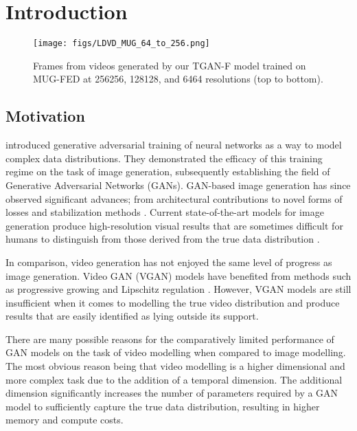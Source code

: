 \documentclass[a4paper,fleqn]{cas-sc}
\begin{document}
\maketitle


\section{Introduction}

\begin{figure}[pos=!h]
    \centering
    \texttt{[image: figs/LDVD\_MUG\_64\_to\_256.png]}
    
    \caption{Frames from videos generated by our TGAN-F model trained on MUG-FED at 256256,
128128, and 6464 resolutions (top to bottom).} 
    \label{fig:MUG_ldvd_64_256}
\end{figure}

\subsection{Motivation}
\citet{GoodfellowPMXWOCB14generative} introduced generative adversarial training of neural networks as a way to model complex data distributions. They demonstrated the efficacy of this training regime on the task of image generation, subsequently establishing the field of Generative Adversarial Networks (GANs). GAN-based image generation has since observed significant advances; from architectural contributions \cite{RadfordMC15unsupervised,zhangGMO2018attention, karras2018progressive} to novel forms of losses \cite{ArjovskyCB17wasserstein,jolicoeur-martineau2018relativistic} and stabilization methods \cite{MiyatoKKY18spectral,HeuselRUNH17updaterule, salimansGZCRCC2016improved,Gulrajani2017improved}. Current state-of-the-art models for image generation produce high-resolution visual results that are sometimes difficult for humans to distinguish from those derived from the true data distribution \cite{brockDS2018large,karrasLA2018style}.

In comparison, video generation has not enjoyed the same level of progress as image generation. Video GAN (VGAN) models have benefited from methods such as progressive growing \cite{AcharyaHPG2018towards} and Lipschitz regulation \cite{SaitoMS17temporal}. However, VGAN models are still insufficient when it comes to modelling the true video distribution and produce results that are easily identified as lying outside its support. 


There are many possible reasons for the comparatively limited performance of GAN models on the task of video modelling when compared to image modelling. The most obvious reason being that video modelling is a higher dimensional and more complex task due to the addition of a temporal dimension. The additional dimension significantly increases the number of parameters required by a GAN model to sufficiently capture the true data distribution, resulting in higher memory and compute costs. 
\end{document}
